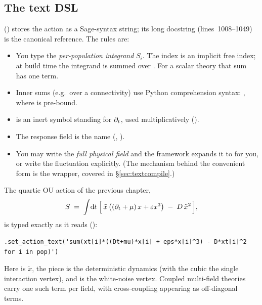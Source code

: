 \subsection{The text DSL}

 () stores the action as a
Sage-syntax string; its long docstring (lines~1008--1049) is the canonical
reference. The rules are:

\begin{itemize}
  \item You type the \emph{per-population integrand} $S_i$. The index  is
        an implicit free index; at build time the integrand is summed over
        . For a scalar theory that sum has one
        term.
  \item Inner sums (e.g.\ over a connectivity) use Python comprehension syntax:
        , where
         is pre-bound.
  \item {} is an inert symbol standing for $\partial_t$, used multiplicatively
        ().
  \item The response field is the  name (, ).
  \item You may write the \emph{full physical field}  and the framework
        expands it to  for you, or write the fluctuation
         explicitly. (The mechanism behind the convenient 
        form is the  wrapper, covered in
        \S\ref{sec:textcompile}.)
\end{itemize}

The quartic OU action of the previous chapter,
\begin{equation}
  S \;=\; \int\!\mathrm{d} t\;\Big[\, \tilde x\,\big((\partial_t+\mu)\,x + \varepsilon x^{3}\big)
        \;-\; D\,\tilde x^{2} \,\Big],
  \label{eq:ouquartic-here}
\end{equation}
is typed exactly as it reads ():

\begin{lstlisting}
.set_action_text('sum(xt[i]*((Dt+mu)*x[i] + eps*x[i]^3) - D*xt[i]^2 for i in pop)')
\end{lstlisting}

Here  is $\tilde x$, the  piece is the
deterministic dynamics (with the cubic  the single interaction
vertex), and  is the white-noise vertex. Coupled multi-field
theories carry one such term per field, with cross-coupling appearing as
off-diagonal terms.


